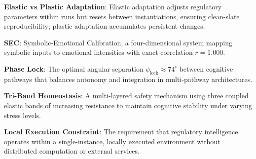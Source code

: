 \documentclass[12pt,a4paper]{report}
\begin{document}
\textbf{Elastic vs Plastic Adaptation}: Elastic adaptation adjusts regulatory 
parameters within runs but resets between instantiations, ensuring clean-slate 
reproducibility; plastic adaptation accumulates persistent changes.

\textbf{SEC}: Symbolic-Emotional Calibration, a four-dimensional system mapping 
symbolic inputs to emotional intensities with exact correlation \(r = 1.000\).

\textbf{Phase Lock}: The optimal angular separation \(\phi_{\text{lock}} \approx 74^\circ\) 
between cognitive pathways that balances autonomy and integration in multi-pathway 
architectures.

\textbf{Tri-Band Homeostasis}: A multi-layered safety mechanism using three coupled elastic bands of increasing resistance to maintain cognitive stability under varying stress levels.

\textbf{Local Execution Constraint}: The requirement that regulatory intelligence operates within a single-instance, locally executed environment without distributed computation or external services.
\end{document}
